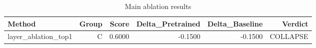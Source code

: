\begin{table}[htbp]
\centering
\caption{Main ablation results}
\label{tab:main-results}
\begin{tabular}{lrrrrr}
\toprule
\textbf{Method} & \textbf{Group} & \textbf{Score} & \textbf{Delta\_Pretrained} & \textbf{Delta\_Baseline} & \textbf{Verdict} \\
\midrule
layer\_ablation\_top1 & C & 0.6000 & -0.1500 & -0.1500 & COLLAPSE \\
\bottomrule
\end{tabular}
\end{table}
